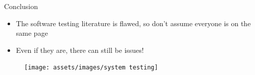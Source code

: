 \begin{frame}{Conclusion}
    \begin{itemize}
        \item The software testing literature is flawed, so
              don't assume everyone is on the same page

              \pause
        \item Even if they are, there can still be issues!
    \end{itemize}
    \begin{figure}
        \texttt{[image: assets/images/system testing]}
        \caption{\tiny \citep[p.~23]{Firesmith2015}}
    \end{figure}
\end{frame}
